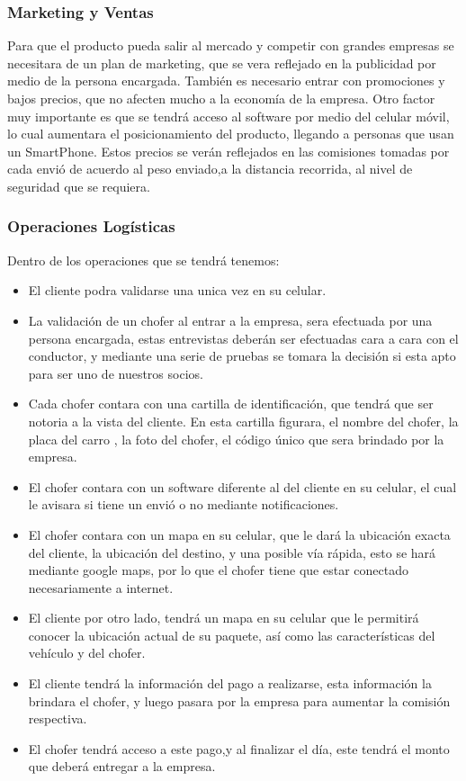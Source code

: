 \subsubsection{Marketing y Ventas}
Para que el producto pueda salir al mercado y competir con grandes empresas se necesitara de un plan de marketing, que se vera reflejado en la publicidad por medio de la persona encargada. También es necesario entrar con promociones y bajos precios, que no afecten mucho a la economía de la empresa. Otro factor muy importante es que se tendrá acceso al software por medio del celular móvil, lo cual aumentara el posicionamiento del producto, llegando a personas que usan un SmartPhone.
Estos precios se verán reflejados en las comisiones tomadas por cada envió de acuerdo al peso enviado,a la distancia recorrida, al nivel de seguridad que se requiera.

\subsubsection{Operaciones Logísticas}
Dentro de los operaciones que se tendrá tenemos:
\begin{itemize}
    \item El cliente podra validarse una unica vez en su celular.
    \item La validación de un chofer al entrar a la empresa, sera efectuada por una persona encargada, estas entrevistas deberán ser efectuadas cara a cara con el conductor, y mediante una serie de pruebas se tomara la decisión si esta apto para ser uno de nuestros socios.
    \item Cada chofer contara con una cartilla de identificación, que tendrá que ser notoria a la vista del cliente. En esta cartilla figurara, el nombre del chofer, la placa del carro , la foto del chofer, el código único que sera brindado por la empresa.
    \item El chofer contara con un software diferente al del cliente en su celular, el cual le avisara si tiene un envió o no mediante notificaciones.
    \item El chofer contara con un mapa en su celular, que le dará la ubicación exacta del cliente, la ubicación del destino, y una posible vía rápida, esto se hará mediante google maps, por lo que el chofer tiene que estar conectado necesariamente a internet.
    \item El cliente por otro lado, tendrá un mapa en su celular que le permitirá conocer la ubicación actual de su paquete, así como las características del vehículo y del chofer.
    \item El cliente tendrá la información del pago a realizarse, esta información la brindara el chofer, y luego pasara por la empresa para aumentar la comisión respectiva. 
    \item El chofer tendrá acceso a este pago,y al finalizar el día, este tendrá el monto que deberá entregar a la empresa.
\end{itemize}

